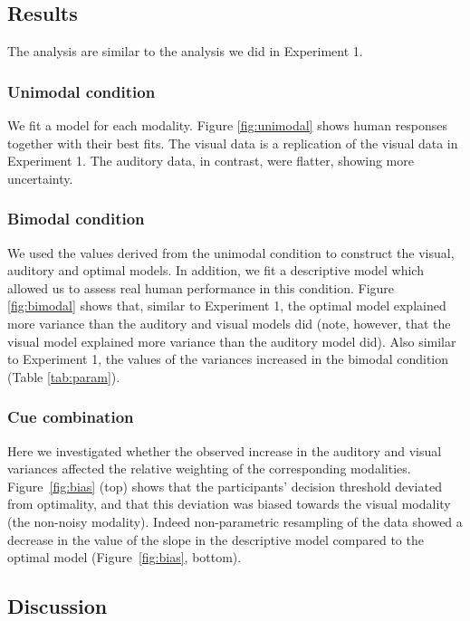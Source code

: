 \documentclass[english,,man,floatsintext]{apa6}
\theoremstyle{definition}
\theoremstyle{definition}
\theoremstyle{definition}
\theoremstyle{remark}
\begin{document}
\subsection{Results}\label{results}

The analysis are similar to the analysis we did in Experiment 1.

\subsubsection{Unimodal condition}\label{unimodal-condition}

We fit a model for each modality. Figure \ref{fig:unimodal} shows human
responses together with their best fits. The visual data is a
replication of the visual data in Experiment 1. The auditory data, in
contrast, were flatter, showing more uncertainty.

\subsubsection{Bimodal condition}\label{bimodal-condition-2}

We used the values derived from the unimodal condition to construct the
visual, auditory and optimal models. In addition, we fit a descriptive
model which allowed us to assess real human performance in this
condition. Figure \ref{fig:bimodal} shows that, similar to Experiment 1,
the optimal model explained more variance than the auditory and visual
models did (note, however, that the visual model explained more variance
than the auditory model did). Also similar to Experiment 1, the values
of the variances increased in the bimodal condition (Table
\ref{tab:param}).

\subsubsection{Cue combination}\label{cue-combination-1}

Here we investigated whether the observed increase in the auditory and
visual variances affected the relative weighting of the corresponding
modalities. Figure~\ref{fig:bias} (top) shows that the participants'
decision threshold deviated from optimality, and that this deviation was
biased towards the visual modality (the non-noisy modality). Indeed
non-parametric resampling of the data showed a decrease in the value of
the slope in the descriptive model compared to the optimal model
(Figure~\ref{fig:bias}, bottom).

\subsection{Discussion}\label{discussion-1}
\end{document}
